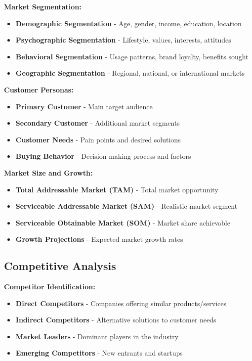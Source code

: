 \documentclass[12pt]{article}
\begin{document}
\textbf{Market Segmentation:}
\begin{itemize}
    \item \textbf{Demographic Segmentation} - Age, gender, income, education, location
    \item \textbf{Psychographic Segmentation} - Lifestyle, values, interests, attitudes
    \item \textbf{Behavioral Segmentation} - Usage patterns, brand loyalty, benefits sought
    \item \textbf{Geographic Segmentation} - Regional, national, or international markets
\end{itemize}

\textbf{Customer Personas:}
\begin{itemize}
    \item \textbf{Primary Customer} - Main target audience
    \item \textbf{Secondary Customer} - Additional market segments
    \item \textbf{Customer Needs} - Pain points and desired solutions
    \item \textbf{Buying Behavior} - Decision-making process and factors
\end{itemize}

\textbf{Market Size and Growth:}
\begin{itemize}
    \item \textbf{Total Addressable Market (TAM)} - Total market opportunity
    \item \textbf{Serviceable Addressable Market (SAM)} - Realistic market segment
    \item \textbf{Serviceable Obtainable Market (SOM)} - Market share achievable
    \item \textbf{Growth Projections} - Expected market growth rates
\end{itemize}

\subsection{Competitive Analysis}

\textbf{Competitor Identification:}
\begin{itemize}
    \item \textbf{Direct Competitors} - Companies offering similar products/services
    \item \textbf{Indirect Competitors} - Alternative solutions to customer needs
    \item \textbf{Market Leaders} - Dominant players in the industry
    \item \textbf{Emerging Competitors} - New entrants and startups
\end{itemize}
\end{document}
